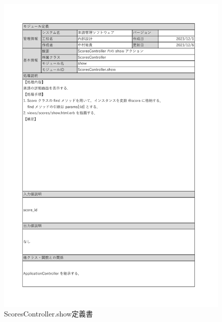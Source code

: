 \begin{figure}
    \centering
    \includegraphics[scale=0.7]{img/Scores/xlsx/ScoresController_show.pdf}
    \vspace{-1cm}
    \caption{ScoresController.show定義書}
\end{figure}
